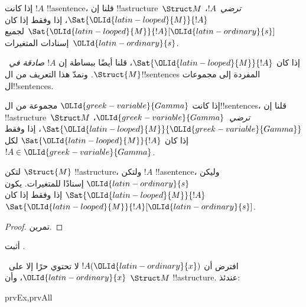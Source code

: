 \documentclass[../../../include/open-logic-section]{subfiles}
\begin{document}
\begin{defn}
إذا كانت $!A$ !!a{sentence}، قلنا إن !!a{structure}~$\Struct M$
\emph{ترضي}~$!A$، $\Sat{{\OLId{latin-looped}{M}}}{!A}$، إذا وفقط إذا كان
$\Sat{{\OLId{latin-looped}{M}}}{!A}[{\OLId{latin-ordinary}{s}}]$ لجميع إسنادات المتغيرات~${\OLId{latin-ordinary}{s}}$.
\end{defn}

إذا كان $\Sat{{\OLId{latin-looped}{M}}}{!A}$، قلنا أيضًا ببساطة إن
\emph{$!A$ صادقة في~$\Struct{M}$.} ونمدّ هذا التعريف
من ال!!{sentence}s المفردة إلى مجموعات ال!!{sentence}s.

\begin{defn}
إذا كانت ${\OLId{greek-variable}{Gamma}}$ مجموعة من ال!!{sentence}s، قلنا إن
!!a{structure}~$\Struct M$ \emph{ترضي}~${\OLId{greek-variable}{Gamma}}$،
$\Sat{{\OLId{latin-looped}{M}}}{{\OLId{greek-variable}{Gamma}}}$، إذا وفقط إذا كان $\Sat{{\OLId{latin-looped}{M}}}{!A}$ لكل
$!A \in {\OLId{greek-variable}{Gamma}}$.
\end{defn}

\begin{prop}
  لتكن $\Struct{M}$ !!a{structure}، ولتكن $!A$ !!a{sentence}، وليكن
  ${\OLId{latin-ordinary}{s}}$ إسنادًا للمتغيرات. يكون $\Sat{{\OLId{latin-looped}{M}}}{!A}$ إذا وفقط إذا كان
  $\Sat{{\OLId{latin-looped}{M}}}{!A}[{\OLId{latin-ordinary}{s}}]$.
\end{prop}

\begin{proof}
تمرين.
\end{proof}

\begin{prob}
أثبت .
\end{prob}

\begin{prop}
  افترض أن $!A({\OLId{latin-ordinary}{x}})$ لا تحتوي حرًا إلا على~${\OLId{latin-ordinary}{x}}$، وأن $\Struct M$
  !!a{structure}. عندئذ:
  \begin{tagenumerate}{prvEx,prvAll}
\end{tagenumerate}
\end{prop}
\end{document}
